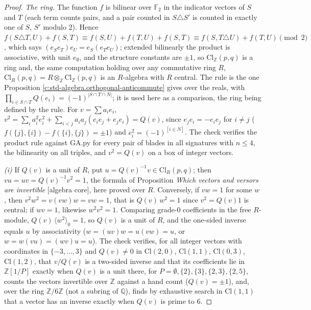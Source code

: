 \documentclass[11pt]{article}
\theoremstyle{definition}
\theoremstyle{plain}
\providecommand{\Cl}{}\renewcommand{\Cl}{\mathrm{Cl}}
\providecommand{\Q}{}\renewcommand{\Q}{\mathbb{Q}}
\providecommand{\Z}{}\renewcommand{\Z}{\mathbb{Z}}
\begin{document}
\begin{proof}
\emph{The ring.} The function $f$ is bilinear over $\mathbb{F}_{2}$ in the indicator vectors of $S$ and $T$ (each term counts pairs, and a pair counted in $S \triangle S'$ is counted in exactly one of $S$, $S'$ modulo $2$). Hence $f(S \triangle T, U) + f(S, T) \equiv f(S, U) + f(T, U) + f(S, T) \equiv f(S, T \triangle U) + f(T, U) \pmod 2$, which says $(e_{S}e_{T})e_{U} = e_{S}(e_{T}e_{U})$; extended bilinearly the product is associative, with unit $e_{\emptyset}$, and the structure constants are $\pm 1$, so $\Cl_{\Z}(p,q)$ is a ring and, the same computation holding over any commutative ring $R$, $\Cl_{R}(p,q) = R \otimes_{\Z}\Cl_{\Z}(p,q)$ is an $R$-algebra with $R$ central. The rule is the one Proposition \ref{c:std-algebra.orthogonal-anticommute} gives over the reals, with $\prod_{i \in S \cap T}Q(e_{i}) = (-1)^{|S \cap T \cap N|}$; it is used here as a comparison, the ring being defined by the rule. For $v = \sum a_{i}e_{i}$, $v^{2} = \sum_{i}a_{i}^{2}e_{i}^{2} + \sum_{i < j}a_{i}a_{j}(e_{i}e_{j} + e_{j}e_{i}) = Q(v)$, since $e_{j}e_{i} = -e_{i}e_{j}$ for $i \ne j$ ($f(\{j\}, \{i\}) - f(\{i\}, \{j\}) = \pm 1$) and $e_{i}^{2} = (-1)^{[i \in N]}$. The check verifies the product rule against GA.py for every pair of blades in all signatures with $n \le 4$, the bilinearity on all triples, and $v^{2} = Q(v)$ on a box of integer vectors.

\emph{(i)} If $Q(v)$ is a unit of $R$, put $u = Q(v)^{-1}v \in \Cl_{R}(p,q)$; then $vu = uv = Q(v)^{-1}v^{2} = 1$, the formula of Proposition \emph{Which vectors and versors are invertible} [algebra core], here proved over $R$. Conversely, if $vw = 1$ for some $w$, then $v^{2}w^{2} = v(vw)w = vw = 1$, that is $Q(v)\,w^{2} = 1$ since $v^{2} = Q(v)1$ is central; if $wv = 1$, likewise $w^{2}v^{2} = 1$. Comparing grade-$0$ coefficients in the free $R$-module, $Q(v)\,\langle w^{2}\rangle_{0} = 1$, so $Q(v)$ is a unit of $R$, and the one-sided inverse equals $u$ by associativity ($w = (uv)w = u(vw) = u$, or $w = w(vu) = (wv)u = u$). The check verifies, for all integer vectors with coordinates in $\{-3, \dots, 3\}$ and $Q(v) \ne 0$ in $\Cl(2,0)$, $\Cl(1,1)$, $\Cl(0,3)$, $\Cl(1,2)$, that $v/Q(v)$ is a two-sided inverse and that its coefficients lie in $\Z[1/P]$ exactly when $Q(v)$ is a unit there, for $P = \emptyset, \{2\}, \{3\}, \{2,3\}, \{2,5\}$, counts the vectors invertible over $\Z$ against a hand count ($Q(v) = \pm 1$), and, over the ring $\Z/6\Z$ (not a subring of $\Q$), finds by exhaustive search in $\Cl(1,1)$ that a vector has an inverse exactly when $Q(v)$ is prime to $6$.


\end{proof}
\end{document}
